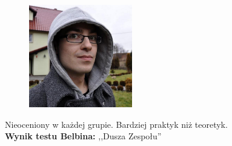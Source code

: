 \begin{figure}[H]
	\centering
	\includegraphics[width=0.4\textwidth]{img/krzysztof.jpg}
\end{figure}
Nieoceniony w każdej grupie. Bardziej praktyk niż teoretyk.\\
\textbf{Wynik testu Belbina: },,Dusza Zespołu''
